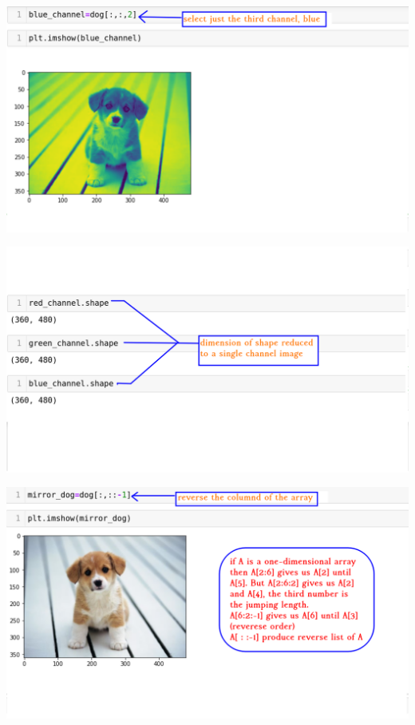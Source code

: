 \documentclass[12pt,aspectratio=169]{beamer}
\begin{document}
\begin{frame}
\begin{center}
\includegraphics[scale=0.5]{dog4}
\end{center}
\end{frame}

\begin{frame}
\begin{center}
\includegraphics[scale=0.5]{dog5}
\end{center}
\end{frame}

\begin{frame}
\begin{center}
\includegraphics[scale=0.5]{dog6}
\end{center}
\end{frame}
\end{document}
